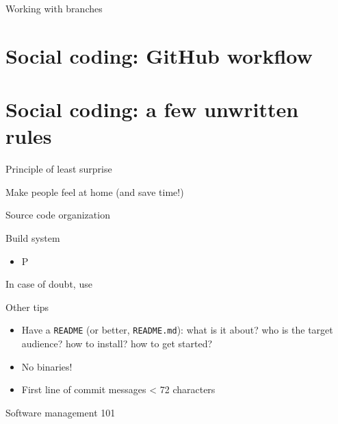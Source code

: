 \documentclass[compress]{beamer}
\begin{document}
\begin{frame}{Working with branches}
\end{frame}

\section{Social coding: GitHub workflow}


\section{Social coding: a few unwritten rules}

\begin{frame}{}
    \centering

    {\Medium Principle of least surprise}

    Make people feel at home (and save time!)

\end{frame}
\begin{frame}{Source code organization}



\end{frame}

\begin{frame}{Build system}

    \begin{itemize}
        \item P
    \end{itemize}
    
    In case of doubt, use
\end{frame}

\begin{frame}{Other tips}
    \begin{itemize}
        \item Have a \texttt{README} (or better, \texttt{README.md}): what is
            it about? who is the target audience? how to install? how to get started?
        \item No binaries!
        \item First line of commit messages < 72 characters
    \end{itemize}
\end{frame}

\begin{frame}{Software management 101}

\end{frame}
\end{document}

